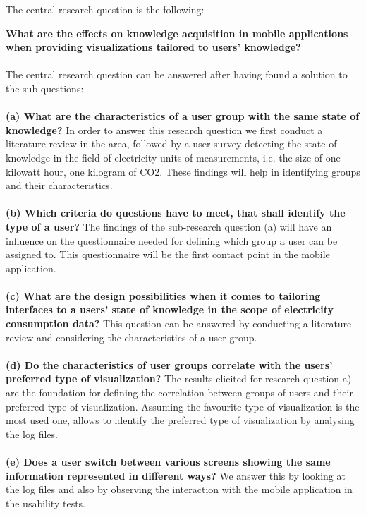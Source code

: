 The central research question is the following:

\textbf{What are the effects on knowledge acquisition in mobile applications when providing visualizations tailored to users' knowledge?}
\\\\
The central research question can be answered after having found a solution to the sub-questions:\\\\
\textbf{(a) What are the characteristics of a user group with the same state of knowledge?}
In order to answer this research question we first conduct a literature review in the area, followed by a user survey detecting the state of knowledge in the field of electricity units of measurements, i.e. the size of one kilowatt hour, one kilogram of CO2. These findings will help in identifying groups and their characteristics.\\\\
\textbf{(b) Which criteria do questions have to meet, that shall identify the type of a user?}
The findings of the sub-research question (a) will have an influence on the questionnaire needed for defining which group a user can be assigned to. This questionnaire will be the first contact point in the mobile application.
\\\\
\textbf{(c) What are the design possibilities when it comes to tailoring interfaces to a users' state of knowledge in the scope of electricity consumption data?}
This question can be answered by conducting a literature review and considering the characteristics of a user group.
\\\\
\textbf{(d) Do the characteristics of user groups correlate with the users' preferred type of visualization?}
The results elicited for research question a) are the foundation for defining the correlation between groups of users and their preferred type of visualization. Assuming the favourite type of visualization is the most used one, allows to identify the preferred type of visualization by analysing the log files.
\\\\
\textbf{(e) Does a user switch between various screens showing the same information represented in different ways?}
We answer this by looking at the log files and also by observing the interaction with the mobile application in the usability tests.

